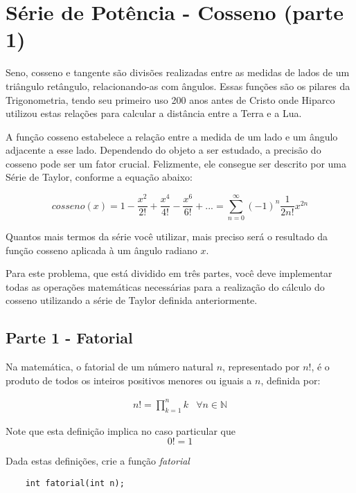 \section{Série de Potência - Cosseno (parte 1)}
Seno, cosseno e tangente são divisões realizadas entre as medidas de lados de um triângulo retângulo, relacionando-as com ângulos. Essas funções são os pilares da Trigonometria, tendo seu primeiro uso 200 anos antes de Cristo onde Hiparco utilizou estas relações para calcular a distância entre a Terra e a Lua. 

A função cosseno estabelece a relação entre a medida de um lado e um ângulo adjacente a esse lado. Dependendo do objeto a ser estudado, a precisão do cosseno pode ser um fator crucial. Felizmente, ele consegue ser descrito por uma Série de Taylor, conforme a equação abaixo:

\begin{equation*}
	cosseno(x) = 1 - \frac{x^2}{2!} + \frac{x^4}{4!}-\frac{x^6}{6!}+...=\sum_{n = 0}^{\infty }(-1)^n\frac{1}{2n!}x^{2n}
\end{equation*}

Quantos mais termos da série você utilizar, mais preciso será o resultado da função cosseno aplicada à um ângulo radiano $x$.


Para este problema, que está dividido em três partes, você deve implementar todas as operações matemáticas necessárias para a realização do cálculo do cosseno utilizando a série de Taylor definida anteriormente.

\subsection*{Parte 1 - Fatorial}
Na matemática, o fatorial de um número natural $n$, representado por $n!$, é o produto de todos os inteiros positivos menores ou iguais a $n$, definida por:

\begin{equation*}
	\begin{matrix}
		n! = \prod_{k=1}^{n}k  & \forall n\in\mathbb{N}
	\end{matrix}
\end{equation*}

Note que esta definição implica no caso particular que
\begin{equation*}
	0! = 1
\end{equation*}

Dada estas definições, crie a função \emph{fatorial}

\begin{lstlisting}
	int fatorial(int n);
\end{lstlisting}

